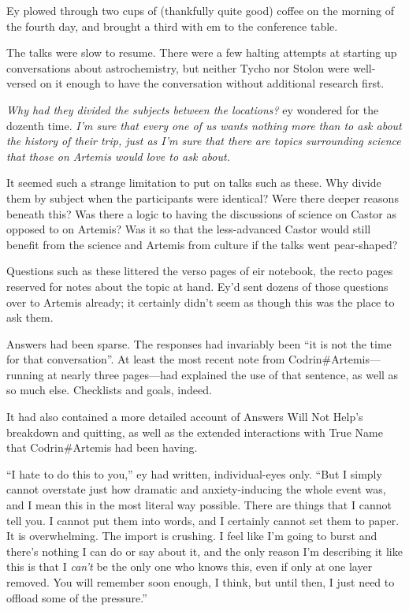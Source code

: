 Ey plowed through two cups of (thankfully quite good) coffee on the morning of the fourth day, and brought a third with em to the conference table.

The talks were slow to resume. There were a few halting attempts at starting up conversations about astrochemistry, but neither Tycho nor Stolon were well-versed on it enough to have the conversation without additional research first.

\emph{Why had they divided the subjects between the locations?} ey wondered for the dozenth time. \emph{I'm sure that every one of us wants nothing more than to ask about the history of their trip, just as I'm sure that there are topics surrounding science that those on Artemis would love to ask about.}

It seemed such a strange limitation to put on talks such as these. Why divide them by subject when the participants were identical? Were there deeper reasons beneath this? Was there a logic to having the discussions of science on Castor as opposed to on Artemis? Was it so that the less-advanced Castor would still benefit from the science and Artemis from culture if the talks went pear-shaped?

Questions such as these littered the verso pages of eir notebook, the recto pages reserved for notes about the topic at hand. Ey'd sent dozens of those questions over to Artemis already; it certainly didn't seem as though this was the place to ask them.

Answers had been sparse. The responses had invariably been ``it is not the time for that conversation''. At least the most recent note from Codrin\#Artemis—running at nearly three pages—had explained the use of that sentence, as well as so much else. Checklists and goals, indeed.

It had also contained a more detailed account of Answers Will Not Help's breakdown and quitting, as well as the extended interactions with True Name that Codrin\#Artemis had been having.

``I hate to do this to you,'' ey had written, individual-eyes only. ``But I simply cannot overstate just how dramatic and anxiety-inducing the whole event was, and I mean this in the most literal way possible. There are things that I cannot tell you. I cannot put them into words, and I certainly cannot set them to paper. It is overwhelming. The import is crushing. I feel like I'm going to burst and there's nothing I can do or say about it, and the only reason I'm describing it like this is that I \emph{can't} be the only one who knows this, even if only at one layer removed. You will remember soon enough, I think, but until then, I just need to offload some of the pressure.''

